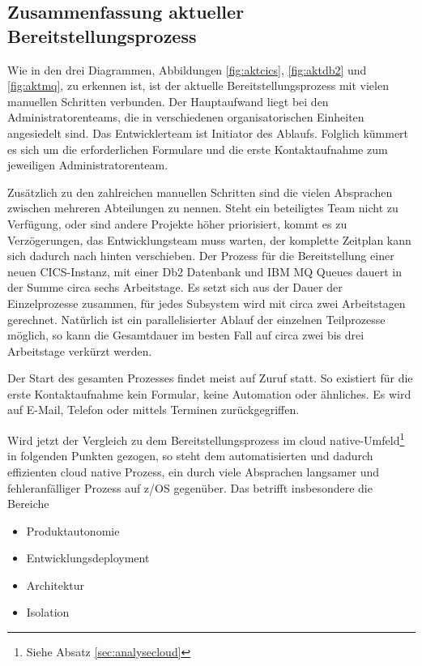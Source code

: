 \subsection{Zusammenfassung aktueller Bereitstellungsprozess}\label{ssec:sumaktbereit}
Wie in den drei Diagrammen, Abbildungen \ref{fig:aktcics}, \ref{fig:aktdb2} und \ref{fig:aktmq}, zu erkennen ist, ist der aktuelle Bereitstellungsprozess mit vielen manuellen Schritten verbunden.
Der Hauptaufwand liegt bei den Administratorenteams, die in verschiedenen organisatorischen Einheiten angesiedelt sind.
Das Entwicklerteam ist  Initiator des Ablaufs.
Folglich kümmert es sich um die erforderlichen Formulare und die erste Kontaktaufnahme zum jeweiligen Administratorenteam.

Zusätzlich zu den zahlreichen manuellen Schritten sind die vielen Absprachen zwischen mehreren Abteilungen zu nennen.
Steht ein beteiligtes Team nicht zu Verfügung, oder sind andere Projekte höher priorisiert, kommt es zu Verzögerungen, das Entwicklungsteam muss warten, der komplette Zeitplan kann sich dadurch nach hinten verschieben.
Der Prozess für die Bereitstellung einer neuen CICS-Instanz, mit einer Db2 Datenbank und IBM MQ Queues dauert in der Summe circa sechs Arbeitstage.
Es setzt sich aus der Dauer der Einzelprozesse zusammen, für jedes Subsystem wird mit circa zwei Arbeitstagen gerechnet.
Natürlich ist ein parallelisierter Ablauf der einzelnen Teilprozesse möglich, so kann die Gesamtdauer im besten Fall auf circa zwei bis drei Arbeitstage verkürzt werden. 

Der Start des gesamten Prozesses findet meist auf \glqq Zuruf\grqq{} statt.
So existiert für die erste Kontaktaufnahme kein Formular, keine Automation oder ähnliches.
Es wird auf E-Mail, Telefon oder mittels Terminen zurückgegriffen.

Wird jetzt der Vergleich zu dem Bereitstellungsprozess im cloud native-Umfeld\footnote{Siehe Absatz \ref{sec:analysecloud}} in folgenden Punkten gezogen, so steht dem automatisierten und dadurch effizienten cloud native Prozess, ein durch viele Absprachen langsamer und fehleranfälliger Prozess auf z/OS gegenüber. 
Das betrifft insbesondere die Bereiche

\begin{itemize}
\item Produktautonomie
\item Entwicklungsdeployment
\item Architektur
\item Isolation
\end{itemize}

